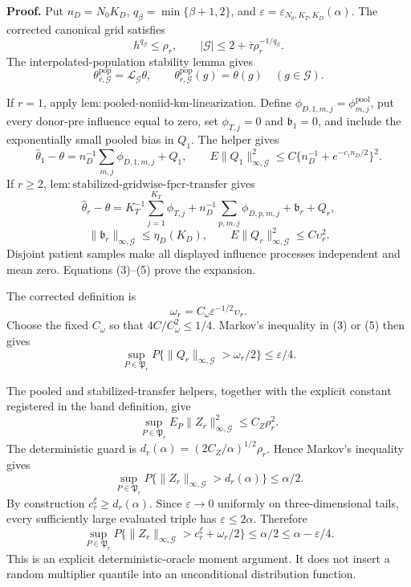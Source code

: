 \textbf{Proof.}
Put \(n_D=N_0K_D\), \(q_\beta=\min\{\beta+1,2\}\), and \(\varepsilon=\varepsilon_{N_0,K_T,K_D}(\alpha)\). The corrected canonical grid satisfies
\[
 h^{q_\beta}\le\rho_r,
 \qquad |\mathcal G|\le2+\bar\tau\rho_r^{-1/q_\beta}.     \tag{1}
\]
The interpolated-population stability lemma gives
\[
 \theta^{\mathrm{pop}}_{r,\mathcal G}
 =\mathcal L_{\mathcal G}\theta,
 \qquad \theta^{\mathrm{pop}}_{r,\mathcal G}(g)=\theta(g)
 \quad(g\in\mathcal G).                                  \tag{2}
\]

If \(r=1\), apply \(\mathrm{lem:pooled\mbox{-}noniid\mbox{-}km\mbox{-}linearization}\). Define \(\phi_{D,1,m,j}=\phi_{m,j}^{\mathrm{pool}}\), put every donor-pre influence equal to zero, set \(\phi_{T,j}=0\) and \(\mathfrak b_1=0\), and include the exponentially small pooled bias in \(Q_1\). The helper gives
\[
 \widehat\theta_1-\theta
 =n_D^{-1}\sum_{m,j}\phi_{D,1,m,j}+Q_1,
 \qquad E\|Q_1\|_{\infty,\mathcal G}^2
 \le C\{n_D^{-1}+e^{-c_\dagger n_D/2}\}^2.              \tag{3}
\]
If \(r\ge2\), \(\mathrm{lem:stabilized\mbox{-}gridwise\mbox{-}fpcr\mbox{-}transfer}\) gives
\[
 \widehat\theta_r-\theta
 =K_T^{-1}\sum_{j=1}^{K_T}\phi_{T,j}
 +n_D^{-1}\sum_{p,m,j}\phi_{D,p,m,j}
 +\mathfrak b_r+Q_r,                                      \tag{4}
\]
\[
 \|\mathfrak b_r\|_{\infty,\mathcal G}\le\eta_D(K_D),
 \qquad E\|Q_r\|_{\infty,\mathcal G}^2\le C\upsilon_r^2. \tag{5}
\]
Disjoint patient samples make all displayed influence processes independent and mean zero. Equations (3)--(5) prove the expansion.

The corrected definition is
\[
 \omega_r=C_\omega\varepsilon^{-1/2}\upsilon_r.         \tag{6}
\]
Choose the fixed \(C_\omega\) so that \(4C/C_\omega^2\le1/4\). Markov's inequality in (3) or (5) then gives
\[
 \sup_{P\in\mathfrak P_r}P\{\|Q_r\|_{\infty,\mathcal G}>\omega_r/2\}
 \le\varepsilon/4.                                       \tag{7}
\]

The pooled and stabilized-transfer helpers, together with the explicit constant registered in the band definition, give
\[
 \sup_{P\in\mathfrak P_r}E_P\|Z_r\|_{\infty,\mathcal G}^2
 \le C_Z\rho_r^2.                                        \tag{8}
\]
The deterministic guard is \(d_r(\alpha)=(2C_Z/\alpha)^{1/2}\rho_r\). Hence Markov's inequality gives
\[
 \sup_{P\in\mathfrak P_r}P\{\|Z_r\|_{\infty,\mathcal G}>d_r(\alpha)\}
 \le\alpha/2.                                            \tag{9}
\]
By construction \(c_r^\xi\ge d_r(\alpha)\). Since \(\varepsilon\to0\) uniformly on three-dimensional tails, every sufficiently large evaluated triple has \(\varepsilon\le2\alpha\). Therefore
\[
 \sup_{P\in\mathfrak P_r}P\{\|Z_r\|_{\infty,\mathcal G}>c_r^\xi+\omega_r/2\}
 \le\alpha/2\le\alpha-\varepsilon/4.                   \tag{10}
\]
This is an explicit deterministic-oracle moment argument. It does not insert a random multiplier quantile into an unconditional distribution function.

